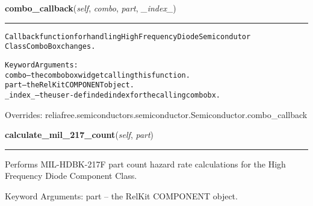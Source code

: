 \hspace{.8\funcindent}\begin{boxedminipage}{\funcwidth}

    \raggedright \textbf{combo\_callback}(\textit{self}, \textit{combo}, \textit{part}, \textit{\_index\_})

    \vspace{-1.5ex}

    \rule{\textwidth}{0.5\fboxrule}
\setlength{\parskip}{2ex}
\begin{alltt}
Callback function for handling High Frequency Diode Semicondutor
Class ComboBox changes.

Keyword Arguments:
  combo -- the combobox widget calling this function.
   part -- the RelKit COMPONENT object.
\_index\_ -- the user-definded index for the calling combobx.
\end{alltt}

\setlength{\parskip}{1ex}
      Overrides: reliafree.semiconductors.semiconductor.Semiconductor.combo\_callback

    \end{boxedminipage}

    \label{reliafree:semiconductors:diode:HighFrequency:calculate_mil_217_count}

    \vspace{0.5ex}

\hspace{.8\funcindent}\begin{boxedminipage}{\funcwidth}

    \raggedright \textbf{calculate\_mil\_217\_count}(\textit{self}, \textit{part})

    \vspace{-1.5ex}

    \rule{\textwidth}{0.5\fboxrule}
\setlength{\parskip}{2ex}
    Performs MIL-HDBK-217F part count hazard rate calculations for the High
    Frequency Diode Component Class.

    Keyword Arguments: part -- the RelKit COMPONENT object.

\setlength{\parskip}{1ex}
    \end{boxedminipage}

    \label{reliafree:semiconductors:diode:HighFrequency:calculate_mil_217_stress}

